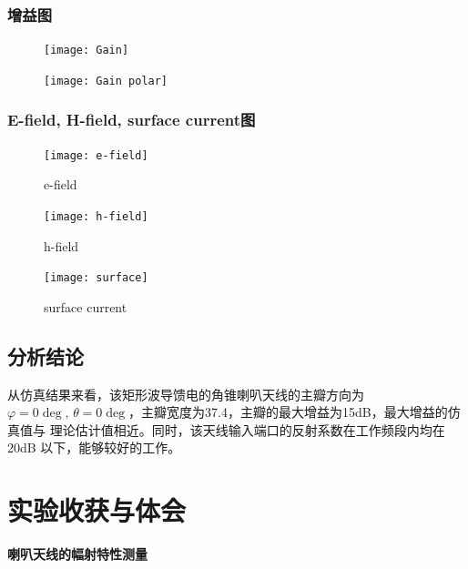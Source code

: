\documentclass{../source/Experiment}
\begin{document}
            \subsubsection{增益图}
            \begin{figure}[H]
                \centering
                \texttt{[image: Gain]}
                \caption{}
            \end{figure}
            \begin{figure}[H]
                \centering
                \texttt{[image: Gain polar]}
                \caption{}
            \end{figure}
            
            \subsubsection{E-field,  H-field,  surface current图}
            \begin{figure}[H]
                \centering
                \texttt{[image: e-field]}
                \caption{e-field}
            \end{figure}
            \begin{figure}[H]
                \centering
                \texttt{[image: h-field]}
                \caption{h-field}
            \end{figure}
            \begin{figure}[H]
                \centering
                \texttt{[image: surface]}
                \caption{surface current}
            \end{figure}
            
        \subsection{分析结论}

            从仿真结果来看，该矩形波导馈电的角锥喇叭天线的主瓣方向为$ \varphi = 0 \deg ,\, \theta = 0 \deg$，主瓣宽度为37.4\degree ，主瓣的最大增益为15dB，最大增益的仿真值与
            理论估计值相近。同时，该天线输入端口的反射系数在工作频段内均在20dB 以下，能够较好的工作。

    \section{实验收获与体会}

    \setcounter{section}{0}
    \setcounter{figure}{0}

    \begin{center}
        \bfseries\Large{喇叭天线的幅射特性测量}
    \end{center}
\end{document}
